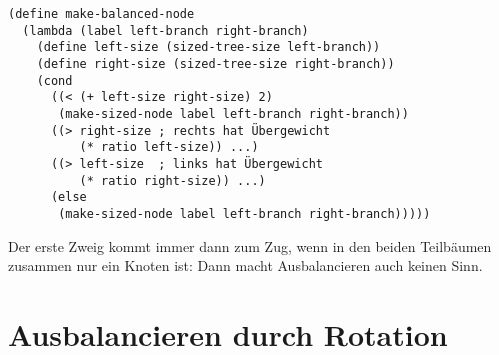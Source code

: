 \begin{lstlisting}
(define make-balanced-node
  (lambda (label left-branch right-branch)
    (define left-size (sized-tree-size left-branch))
    (define right-size (sized-tree-size right-branch))
    (cond
      ((< (+ left-size right-size) 2)
       (make-sized-node label left-branch right-branch))
      ((> right-size ; rechts hat Übergewicht
          (* ratio left-size)) ...)
      ((> left-size  ; links hat Übergewicht
          (* ratio right-size)) ...)
      (else
       (make-sized-node label left-branch right-branch)))))
\end{lstlisting}
%
Der erste Zweig kommt immer dann zum Zug, wenn in den beiden
Teilbäumen zusammen nur ein Knoten ist: Dann macht Ausbalancieren auch
keinen Sinn.

\section{Ausbalancieren durch Rotation}

